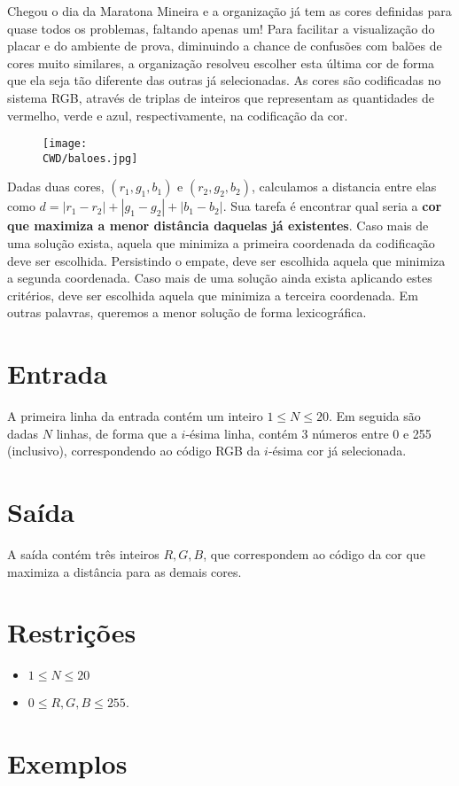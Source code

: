 Chegou o dia da Maratona Mineira e a organização já tem as cores definidas para quase todos os problemas, faltando apenas um!
Para facilitar a visualização do placar e do ambiente de prova, diminuindo a chance de confusões com balões de cores muito similares,
a organização resolveu escolher esta última cor de forma que ela seja tão diferente das outras já selecionadas. As cores são codificadas
no sistema RGB, através de triplas de inteiros que representam as quantidades de vermelho, verde e azul, respectivamente,
na codificação da cor.

\begin{figure}[H]
    \centering
    \texttt{[image: \\CWD/baloes.jpg]}
\end{figure}

Dadas duas cores, $(r_1,g_1,b_1)$ e $(r_2,g_2,b_2)$, calculamos a distancia entre elas como $d = |r_1-r_2| + |g_1-g_2| + |b_1-b_2|$.
Sua tarefa é encontrar qual seria a \textbf{cor que maximiza a menor distância daquelas já existentes}. Caso mais de uma solução exista,
aquela que minimiza a primeira coordenada da codificação deve ser escolhida. Persistindo o empate, deve ser escolhida aquela que minimiza
a segunda coordenada. Caso mais de uma solução ainda exista aplicando estes critérios, deve ser escolhida aquela que minimiza a terceira coordenada. Em outras palavras, queremos a menor solução de forma lexicográfica.

\section*{Entrada}

A primeira linha da entrada contém um inteiro $1 \leq N \leq 20$. Em seguida são dadas $N$ linhas, de forma que a $i$-ésima linha, contém 3 números
entre 0 e 255 (inclusivo), correspondendo ao código RGB da $i$-ésima cor já selecionada.

\section*{Saída}

A saída contém três inteiros $R, G, B$, que correspondem ao código da cor que maximiza a distância para as demais cores.

\section*{Restrições}

\begin{itemize}
\item $1 \leq N \leq 20$
\item $0 \leq R, G, B \leq 255$.
\end{itemize}


\section*{Exemplos}

\sampleio
